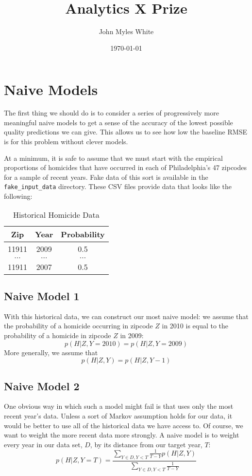 \documentclass[11pt]{amsart}
\title{Analytics X Prize}
\author{John Myles White}
\date{\today}                                           %
\begin{document}
\maketitle

\section{Naive Models}
The first thing we should do is to consider a series of progressively more meaningful naive models to get a sense of the accuracy of the lowest possible quality predictions we can give. This allows us to see how low the baseline RMSE is for this problem without clever models.

At a minimum, it is safe to assume that we must start with the empirical proportions of homicides that have occurred in each of Philadelphia's 47 zipcodes for a sample of recent years. Fake data of this sort is available in the \verb|fake_input_data| directory. These CSV files provide data that looks like the following:
\begin{table}[htdp]
\caption{Historical Homicide Data}
\begin{center}
\begin{tabular}{|c|c|c|}
\hline
Zip & Year & Probability \\
\hline
11911 & 2009 & 0.5 \\
$\ldots$ & $\ldots$ & $\ldots$ \\
11911 & 2007 & 0.5 \\
\hline
\end{tabular}
\end{center}
\label{default}
\end{table}

\subsection{Naive Model 1}
With this historical data, we can construct our most naive model: we assume that the probability of a homicide occurring in zipcode $Z$ in 2010 is equal to the probability of a homicide in zipcode $Z$ in 2009:
\[
p(H | Z, Y = 2010) = p(H | Z, Y = 2009)
\]
More generally, we assume that
\[
p(H | Z, Y) = p(H | Z, Y -1)
\]

\subsection{Naive Model 2}
One obvious way in which such a model might fail is that uses only the most recent year's data. Unless a sort of Markov assumption holds for our data, it would be better to use all of the historical data we have access to. Of course, we want to weight the more recent data more strongly. A naive model is to weight every year in our data set, $D$, by its distance from our target year, $T$:
\[
p(H | Z, Y = T) = \frac{\sum_{Y \in D, Y < T} \frac{1}{T - Y} p(H | Z, Y)}{\sum_{Y \in D, Y < T} \frac{1}{T - Y}}
\]
\end{document}
